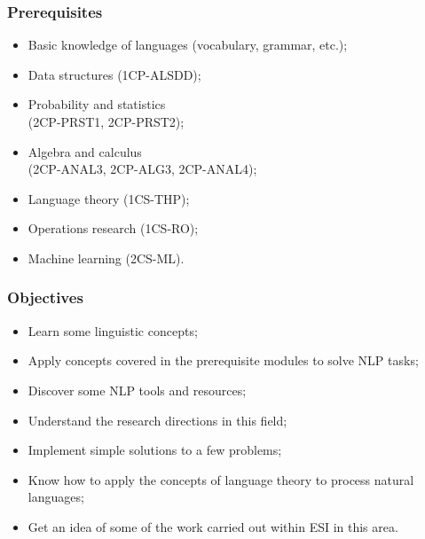 \documentclass{beamer}
\subtitle[Presentation]{Course ``Curse" presentation}
\begin{document}
 

\begin{frame}
\frametitle{Prerequisites}

\begin{itemize}
	\item Basic knowledge of languages (vocabulary, grammar, etc.);
	\item Data structures (1CP-ALSDD);
	\item Probability and statistics \\(2CP-PRST1, 2CP-PRST2);
	\item Algebra and calculus \\(2CP-ANAL3, 2CP-ALG3, 2CP-ANAL4);
	\item Language theory (1CS-THP);
	\item Operations research (1CS-RO);
	\item Machine learning (2CS-ML).
\end{itemize}

\end{frame}


\begin{frame}
\frametitle{Objectives}

\begin{itemize}
	\item Learn some linguistic concepts;
	\item Apply concepts covered in the prerequisite modules to solve NLP tasks;
	\item Discover some NLP tools and resources;
	\item Understand the research directions in this field;
	\item Implement simple solutions to a few problems;
	\item Know how to apply the concepts of language theory to process natural languages;
	\item Get an idea of some of the work carried out within ESI in this area.
\end{itemize}

\end{frame}
\end{document}
